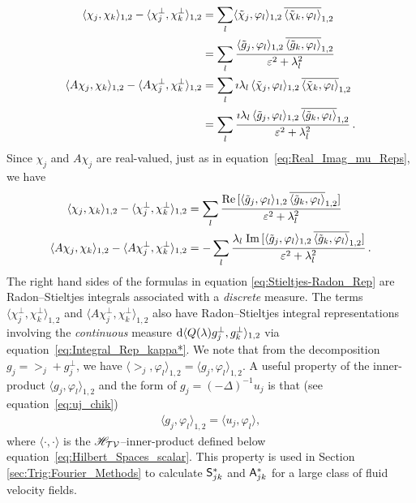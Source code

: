 \documentclass[amsa]{ipart}
\begin{document}
%
\begin{align}%
  \langle\chi_j,\chi_k\rangle_{1,2}-\langle\chi_j^\perp,\chi_k^\perp\rangle_{1,2}&=\sum_l\langle\chit_j,\varphi_l\rangle_{1,2}\,\overline{\langle\chit_k,\varphi_l\rangle}_{1,2}
         \\\notag
         &=\sum_l\frac{\langle\gt_j,\varphi_l\rangle_{1,2}\,\overline{\langle\gt_k,\varphi_l\rangle}_{1,2}}{\varepsilon^2+\lambda_l^2}
         \\\notag
  \langle A\chi_j,\chi_k\rangle_{1,2}-\langle A\chi_j^\perp,\chi_k^\perp\rangle_{1,2}&=\sum_l\imath\lambda_l\,\langle\chit_j,\varphi_l\rangle_{1,2}\,\overline{\langle\chit_k,\varphi_l\rangle}_{1,2}
         \\\notag
         &=\sum_l\frac{\imath\lambda_l\,\langle\gt_j,\varphi_l\rangle_{1,2}\,\overline{\langle\gt_k,\varphi_l\rangle}_{1,2}}{\varepsilon^2+\lambda_l^2}\,.
         \notag
\end{align}
%
Since $\chi_j$ and $A\chi_j$ are real-valued, just as in
equation~\eqref{eq:Real_Imag_mu_Reps}, we have 
%
\begin{align}\label{eq:Stieltjes-Radon_Rep}
  \langle\chi_j,\chi_k\rangle_{1,2}-\langle\chi_j^\perp,\chi_k^\perp\rangle_{1,2}
  &=\sum_l\frac{\Real[\langle\gt_j,\varphi_l\rangle_{1,2}\,\overline{\langle\gt_k,\varphi_l\rangle}_{1,2}]}{\varepsilon^2+\lambda_l^2}
         \\
  \langle A\chi_j,\chi_k\rangle_{1,2}-\langle A\chi_j^\perp,\chi_k^\perp\rangle_{1,2}
  &=-\sum_l\frac{\lambda_l\;\Imag[\langle\gt_j,\varphi_l\rangle_{1,2}\,\overline{\langle\gt_k,\varphi_l\rangle}_{1,2}]}{\varepsilon^2+\lambda_l^2}\,.
         \notag
\end{align}
%
The right hand sides of the formulas in equation
\eqref{eq:Stieltjes-Radon_Rep} are Radon--Stieltjes integrals
associated with a \emph{discrete} measure. The terms $\langle\chi_j^\perp,\chi_k^\perp\rangle_{1,2}$ and
$\langle A\chi_j^\perp,\chi_k^\perp\rangle_{1,2}$ also have Radon--Stieltjes integral representations
involving the \emph{continuous} measure $\mathrm{d}\langle Q(\lambda)g_j^\perp,g_k^\perp\rangle_{1,2}$
via equation~\eqref{eq:Integral_Rep_kappa*}. We note that from the 
decomposition $g_j=\gt_j+g^\perp_j$, we have
$\langle\gt_j,\varphi_l\rangle_{1,2}=\langle g_j,\varphi_l\rangle_{1,2}$. A useful property of the inner-product
$\langle g_j,\varphi_l\rangle_{1,2}$ and the form of $g_j=(-\Delta)^{-1}u_j$ is that (see equation~\eqref{eq:uj_chik})
%
\begin{align}\label{eq:H1_L2}
  \langle g_j,\varphi_l\rangle_{1,2}=\langle u_j,\varphi_l\rangle,
\end{align}
%
where $\langle\cdot,\cdot\rangle$ is the $\mathscr{H}_{\mathcal{T}\mathcal{V}}$--inner-product defined below
equation~\eqref{eq:Hilbert_Spaces_scalar}. 
This property is used in Section \ref{sec:Trig:Fourier_Methods} to
calculate $\mathsf{S}^*_{jk}$ and $\mathsf{A}^*_{jk}$ for a large class of fluid
velocity fields.    
\end{document}
